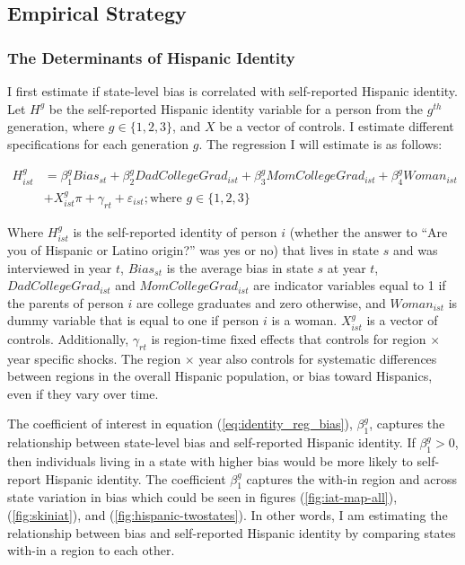 \documentclass[12pt, fullpage]{article}
\begin{document}


\subsection{Empirical Strategy}\label{sec:empstrat}

\subsubsection{The Determinants of Hispanic Identity} %
\label{sub:the_determinants_of_hispanic_identity}

I first estimate if state-level bias is correlated with self-reported Hispanic identity. Let $H^g$ be the self-reported Hispanic identity variable for a person from the $g^{th}$ generation, where $g \in \{1,2,3\}$, and $X$ be a vector of controls. I estimate different specifications for each generation $g$. The regression I will estimate is as follows:

\begin{align}
H_{ist}^g &= \beta_1^g Bias_{st} +\beta_2^g DadCollegeGrad_{ist}+\beta_3^g MomCollegeGrad_{ist}
           + \beta_4^g Woman_{ist} \nonumber\\
           &+ X_{ist}^g\pi + \gamma_{rt} 
           + \varepsilon_{ist}; 
           \text{where } g \in \{1,2,3\} \label{eq:identity_reg_bias}
\end{align}

Where $H^g_{ist}$ is the self-reported identity of person $i$ (whether the answer to ``Are you of Hispanic or Latino origin?'' was yes or no) that lives in state $s$ and was interviewed in year $t$, $Bias_{st}$ is the average bias in state $s$ at year $t$, $DadCollegeGrad_{ist}$ and $MomCollegeGrad_{ist}$ are indicator variables equal to 1 if the parents of person $i$ are college graduates and zero otherwise, and $Woman_{ist}$ is dummy variable that is equal to one if person $i$ is a woman. $X_{ist}^g$ is a vector of controls. Additionally, $\gamma_{rt}$ is region-time fixed effects that controls for region $\times$ year specific shocks. The region $\times$ year also controls for systematic differences between regions in the overall Hispanic population, or bias toward Hispanics, even if they vary over time.

The coefficient of interest in equation (\ref{eq:identity_reg_bias}), $\beta_1^g$, captures the relationship between state-level bias and self-reported Hispanic identity.  If $\beta_1^g > 0$, then individuals living in a state with higher bias would be more likely to self-report Hispanic identity. The coefficient $\beta_1^g$ captures the with-in region and across state variation in bias which could be seen in figures (\ref{fig:iat-map-all}), (\ref{fig:skiniat}), and (\ref{fig:hispanic-twostates}). In other words, I am estimating the relationship between bias and self-reported Hispanic identity by comparing states with-in a region to each other.
\end{document}
